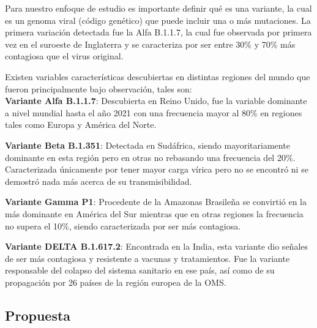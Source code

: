 \documentclass[
]{article}
\begin{document}
Para nuestro enfoque de estudio es importante definir qué es una
variante, la cual es un genoma viral (código genético) que puede incluir
una o más mutaciones. La primera variación detectada fue la Alfa
B.1.1.7, la cual fue observada por primera vez en el suroeste de
Inglaterra y se caracteriza por ser entre 30\% y 70\% más contagiosa que
el virus original.

Existen variables características descubiertas en distintas regiones del
mundo que fueron principalmente bajo observación, tales son:\\
\textbf{Variante Alfa B.1.1.7}: Descubierta en Reino Unido, fue la
variable dominante a nivel mundial hasta el año 2021 con una frecuencia
mayor al 80\% en regiones tales como Europa y América del Norte.

\textbf{Variante Beta B.1.351}: Detectada en Sudáfrica, siendo
mayoritariamente dominante en esta región pero en otras no rebasando una
frecuencia del 20\%. Caracterizada únicamente por tener mayor carga
vírica pero no se encontró ni se demostró nada más acerca de su
transmisibilidad.

\textbf{Variante Gamma P1}: Procedente de la Amazonas Brasileña se
convirtió en la más dominante en América del Sur mientras que en otras
regiones la frecuencia no supera el 10\%, siendo caracterizada por ser
más contagiosa.

\textbf{Variante DELTA B.1.617.2}: Encontrada en la India, esta variante
dio señales de ser más contagiosa y resistente a vacunas y tratamientos.
Fue la variante responsable del colapso del sistema sanitario en ese
país, así como de su propagación por 26 países de la región europea de
la OMS.

\hypertarget{propuesta}{%
\subsection{Propuesta}\label{propuesta}}
\end{document}
